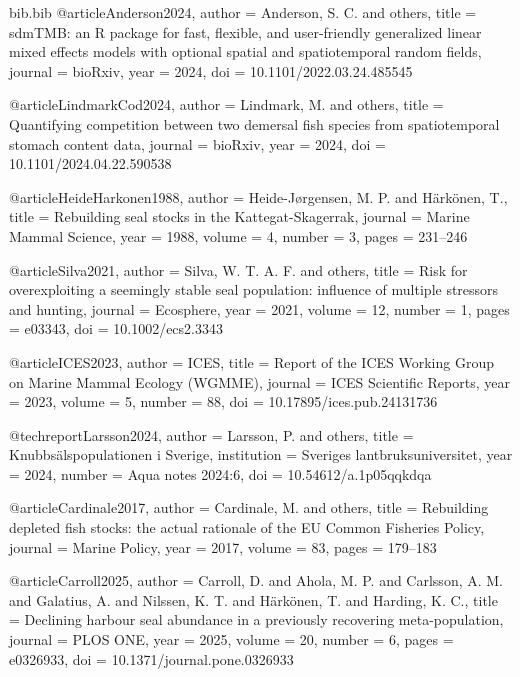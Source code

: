 \begin{filecontents*}{bib.bib}
@article{Anderson2024,
  author  = {Anderson, S. C. and others},
  title   = {{sdmTMB}: an {R} package for fast, flexible, and user-friendly generalized linear mixed effects models with optional spatial and spatiotemporal random fields},
  journal = {bioRxiv},
  year    = {2024},
  doi     = {10.1101/2022.03.24.485545}
}

@article{LindmarkCod2024,
  author  = {Lindmark, M. and others},
  title   = {Quantifying competition between two demersal fish species from spatiotemporal stomach content data},
  journal = {bioRxiv},
  year    = {2024},
  doi     = {10.1101/2024.04.22.590538}
}

@article{HeideHarkonen1988,
  author  = {Heide-J{\o}rgensen, M. P. and H{\"a}rk{\"o}nen, T.},
  title   = {Rebuilding seal stocks in the {K}attegat-{S}kagerrak},
  journal = {Marine Mammal Science},
  year    = {1988},
  volume  = {4},
  number  = {3},
  pages   = {231--246}
}

@article{Silva2021,
  author  = {Silva, W. T. A. F. and others},
  title   = {Risk for overexploiting a seemingly stable seal population: influence of multiple stressors and hunting},
  journal = {Ecosphere},
  year    = {2021},
  volume  = {12},
  number  = {1},
  pages   = {e03343},
  doi     = {10.1002/ecs2.3343}
}

@article{ICES2023,
  author  = {{ICES}},
  title   = {Report of the {ICES} Working Group on {M}arine {M}ammal {E}cology ({WGMME})},
  journal = {ICES Scientific Reports},
  year    = {2023},
  volume  = {5},
  number  = {88},
  doi     = {10.17895/ices.pub.24131736}
}

@techreport{Larsson2024,
  author      = {Larsson, P. and others},
  title       = {Knubbsälspopulationen i {S}verige},
  institution = {Sveriges lantbruksuniversitet},
  year        = {2024},
  number      = {Aqua notes 2024:6},
  doi         = {10.54612/a.1p05qqkdqa}
}

@article{Cardinale2017,
  author  = {Cardinale, M. and others},
  title   = {Rebuilding depleted fish stocks: the actual rationale of the {EU} {C}ommon {F}isheries {P}olicy},
  journal = {Marine Policy},
  year    = {2017},
  volume  = {83},
  pages   = {179--183}
}

@article{Carroll2025,
  author  = {Carroll, D. and Ahola, M. P. and Carlsson, A. M. and Galatius, A. and Nilssen, K. T. and H{\"a}rk{\"o}nen, T. and Harding, K. C.},
  title   = {Declining harbour seal abundance in a previously recovering meta-population},
  journal = {PLOS ONE},
  year    = {2025},
  volume  = {20},
  number  = {6},
  pages   = {e0326933},
  doi     = {10.1371/journal.pone.0326933}
}


\end{filecontents*}
